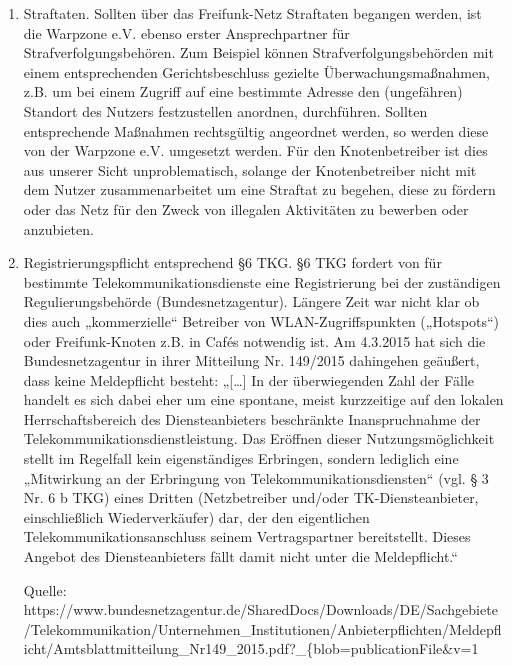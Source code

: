 \documentclass{article}
\begin{document}
\begin{enumerate}
\item Straftaten. Sollten über das Freifunk-Netz Straftaten begangen werden, ist die Warpzone e.V. ebenso erster Ansprechpartner für Strafverfolgungsbehören. Zum Beispiel können Strafverfolgungsbehörden mit einem entsprechenden Gerichtsbeschluss gezielte Überwachungsmaßnahmen, z.B. um bei einem Zugriff auf eine bestimmte Adresse den (ungefähren) Standort des Nutzers festzustellen anordnen, durchführen. Sollten entsprechende Maßnahmen rechtsgültig angeordnet  werden, so werden diese von der Warpzone e.V. umgesetzt werden. Für den Knotenbetreiber ist dies aus unserer Sicht unproblematisch, solange der Knotenbetreiber nicht mit dem Nutzer zusammenarbeitet um eine Straftat zu begehen, diese zu fördern oder das Netz für den Zweck von illegalen Aktivitäten zu bewerben oder anzubieten.

\item Registrierungspflicht entsprechend §6 TKG. §6 TKG fordert von für bestimmte Telekommunikationsdienste eine Registrierung bei der zuständigen Regulierungsbehörde (Bundesnetzagentur). Längere Zeit war nicht klar ob dies auch „kommerzielle“ Betreiber von WLAN-Zugriffspunkten („Hotspots“) oder Freifunk-Knoten z.B. in Cafés notwendig ist. Am 4.3.2015 hat sich die Bundesnetzagentur in ihrer Mitteilung Nr. 149/2015 dahingehen geäußert, dass keine Meldepflicht besteht: „[…] In der überwiegenden Zahl der Fälle handelt es sich dabei eher um eine spontane, meist kurzzeitige auf den lokalen Herrschaftsbereich des Diensteanbieters beschränkte Inanspruchnahme der Telekommunikationsdienstleistung. Das Eröffnen dieser Nutzungsmöglichkeit stellt im Regelfall kein eigenständiges Erbringen, sondern lediglich eine „Mitwirkung an der Erbringung von Telekommunikationsdiensten“ (vgl. § 3 Nr. 6 b TKG) eines Dritten (Netzbetreiber und/oder TK-Diensteanbieter, einschließlich Wiederverkäufer) dar, der den eigentlichen Telekommunikationsanschluss seinem Vertragspartner bereitstellt. Dieses Angebot des  Diensteanbieters fällt damit nicht unter die Meldepflicht.“

Quelle: https://www.bundesnetzagentur.de/SharedDocs/Downloads/DE/Sachgebiete/Telekommunikation/\linebreak Unternehmen\_Institutionen/Anbieterpflichten/Meldepflicht/Amtsblattmitteilung\_Nr149\_2015.pdf?\_\{blob\linebreak =publicationFile\&v=1



\end{enumerate}
\end{document}
